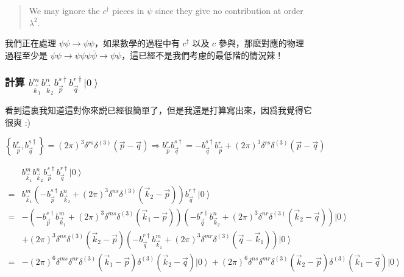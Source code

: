 \documentclass{article}
\begin{document}
\begin{quote}
We may ignore the $c^{\dagger}$ pieces in $\psi$ since they give no contribution at order $\lambda^2$.
\end{quote}

我們正在處理 $\psi\psi\to\psi\psi$，如果數學的過程中有 $c^{\dagger}$ 以及 $c$ 參與，那麽對應的物理過程至少是 $\psi\psi\to\psi\psi\psi\bar{\psi}\to\psi\psi$，這已經不是我們考慮的最低階的情況辣！

\subsubsection{計算 $b_{\vec{k}_1}^mb_{\vec{k}_2}^nb_{\vec{p}}^{s\dagger}b_{\vec{q}}^{r\dagger}\left|0\right\rangle$}

看到這裏我知道這對你來説已經很簡單了，但是我還是打算寫出來，因爲我覺得它很爽 :)

$$
\left\{b_{\vec{p}}^r,b_{\vec{q}}^{s\dagger}\right\}=(2\pi)^3\delta^{rs}\delta^{(3)}(\vec{p}-\vec{q})\Rightarrow b_{\vec{p}}^rb_{\vec{q}}^{s\dagger}=-b_{\vec{q}}^{s\dagger}b_{\vec{p}}^r+(2\pi)^3\delta^{rs}\delta^{(3)}(\vec{p}-\vec{q})
$$

$$
\begin{aligned}
& b_{\vec{k}_1}^mb_{\vec{k}_2}^nb_{\vec{p}}^{s\dagger}b_{\vec{q}}^{r\dagger}\left|0\right\rangle                                                                                                                                     \\
= & b_{\vec{k}_1}^m\left(-b_{\vec{p}}^{s\dagger}b_{\vec{k}_2}^n+(2\pi)^3\delta^{ns}\delta^{(3)}\left(\vec{k}_2-\vec{p}\right)\right)b_{\vec{q}}^{r\dagger}\left|0\right\rangle                                                         \\
= & -\left(-b_{\vec{p}}^{s\dagger}b_{\vec{k}_1}^m+(2\pi)^3\delta^{ms}\delta^{(3)}(\vec{k}_1-\vec{p})\right)\left(-b_{\vec{q}}^{r\dagger}b_{\vec{k}_2}^n+(2\pi)^3\delta^{nr}\delta^{(3)}(\vec{k}_2-\vec{q})\right)\left|0\right\rangle  \\
& +(2\pi)^3\delta^{ns}\delta^{(3)}\left(\vec{k}_2-\vec{p}\right)\left(-b_{\vec{q}}^{r\dagger}b_{\vec{k}_1}^{m}+(2\pi)^3\delta^{mr}\delta^{(3)}(\vec{q}-\vec{k}_1)\right)\left|0\right\rangle                                         \\
= & -(2\pi)^6\delta^{ms}\delta^{nr}\delta^{(3)}(\vec{k}_1-\vec{p})\delta^{(3)}(\vec{k}_2-\vec{q})\left|0\right\rangle+(2\pi)^6\delta^{ns}\delta^{mr}\delta^{(3)}(\vec{k}_2-\vec{p})\delta^{(3)}(\vec{k}_1-\vec{q})\left|0\right\rangle
\end{aligned}
$$
\end{document}
